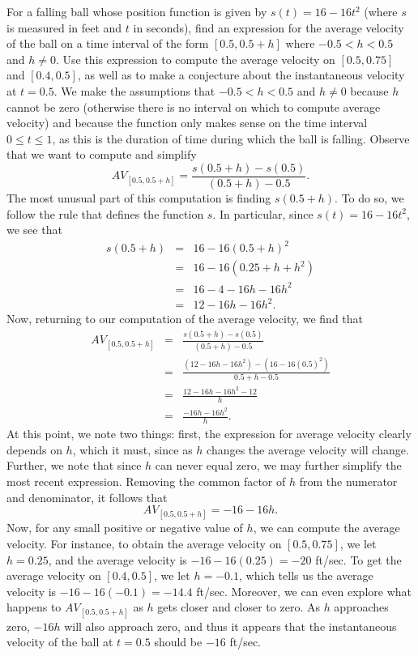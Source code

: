 \bex
For a falling ball whose position function is given by $s(t) = 16 - 16t^2$ (where $s$ is measured in feet and $t$ in seconds), find an expression for the average velocity of the ball on a time interval of the form $[0.5, 0.5+h]$ where $-0.5 < h < 0.5$ and $h \ne 0$.  Use this expression to compute the average velocity on $[0.5,0.75]$ and $[0.4,0.5]$, as well as to make a conjecture about the instantaneous velocity at $t = 0.5$.
\eex
We make the assumptions that $-0.5 < h < 0.5$ and $h \ne 0$ because $h$ cannot be zero (otherwise there is no interval on which to compute average velocity) and because the function only makes sense on the time interval $0 \le t \le 1$, as this is the duration of time during which the ball is falling.  Observe that we want to compute and simplify $$AV_{[0.5, 0.5+h]} = \frac{s(0.5+h) - s(0.5)}{(0.5+h) - 0.5}.$$  The most unusual part of this computation is finding $s(0.5+h)$.  To do so, we follow the rule that defines the function $s$.  In particular, since $s(t) = 16-16t^2$, we see that \begin{eqnarray*}
  s(0.5+h) & = & 16 - 16(0.5 + h)^2 \\
  		& = & 16 - 16(0.25 + h + h^2) \\
		& = & 16 - 4 - 16h - 16h^2 \\
		& = & 12 - 16h - 16h^2.
\end{eqnarray*}
Now, returning to our computation of the average velocity, we find that 
\begin{eqnarray*}
 AV_{[0.5, 0.5+h]} & = & \frac{s(0.5+h) - s(0.5)}{(0.5+h) - 0.5} \\
 			& = & \frac{(12 - 16h - 16h^2) - (16 - 16(0.5)^2)}{0.5 + h - 0.5} \\
			& = & \frac{12 - 16h - 16h^2 - 12}{h} \\
			& = & \frac{-16h - 16h^2}{h}.
\end{eqnarray*}
At this point, we note two things:  first, the expression for average velocity clearly depends on $h$, which it must, since as $h$ changes the average velocity will change.  Further, we note that since $h$ can never equal zero, we may further simplify the most recent expression.  Removing the common factor of $h$ from the numerator and denominator, it follows that
$$ AV_{[0.5, 0.5+h]} = -16 - 16h.$$
Now, for any small positive or negative value of $h$, we can compute the average velocity.  For instance, to obtain the average velocity on $[0.5,0.75]$, we let $h = 0.25$, and the average velocity is $-16 - 16(0.25) = -20$ ft/sec.  To get the average velocity on $[0.4, 0.5]$, we let $h = -0.1$, which tells us the average velocity is $-16 - 16(-0.1) = -14.4$ ft/sec.  Moreover, we can even explore what happens to $AV_{[0.5, 0.5+h]}$ as $h$ gets closer and closer to zero.  As $h$ approaches zero, $-16h$ will also approach zero, and thus it appears that the instantaneous velocity of the ball at $t = 0.5$ should be $-16$ ft/sec.
\afterex



